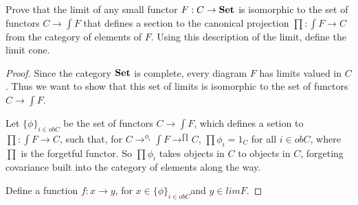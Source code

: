 \documentclass[main.tex]{subfiles}
\begin{document}
\begin{lemma}[3.2.vi]
	Prove that the limit of any small functor $F: C \rightarrow \bold{Set}$ is
	isomorphic to the set of functors $C \rightarrow \int F$ that defines a
	section to the canonical projection $ \prod : \int F \rightarrow C$ from the
	category of elements of $F$. Using this description of the limit, define the
	limit cone.
\end{lemma}

\begin{proof}
	Since the category $\bold{Set}$ is complete, every diagram $F$ has limits
	valued in $C$. Thus we want to show that this set of limits is isomorphic to
	the set of functors $C \rightarrow \int F$.

	Let $\{ \phi\} _{i \in obC}$ be the set of functors $C \rightarrow \int F$,
	which defines a setion to $ \prod : \int F \rightarrow C$, such that, for
	$C\rightarrow^{\phi_i}\int F \rightarrow^{\prod} C$, $\prod \phi_i = 1_C$
	for all $i \in obC$, where $\prod$ is the forgetful functor. So $\prod
	\phi_i$ takes objects in $C$ to objects in $C$, forgeting covariance built
	into the category of elements along the way.

	Define a function $f: x \rightarrow y$, for $x \in \{ \phi\} _{i \in obC}
	$and $y \in limF$.
\end{proof}
\end{document}
